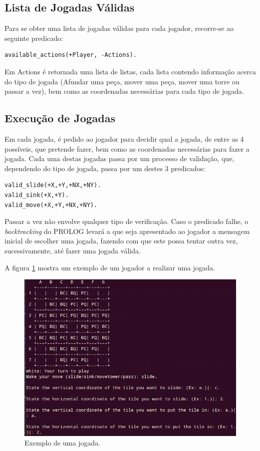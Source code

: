 \documentclass[a4paper]{article}
\begin{document}
\subsection{Lista de Jogadas Válidas}

Para se obter uma lista de jogadas válidas para cada jogador, recorre-se ao seguinte predicado:

\begin{lstlisting}
available_actions(+Player, -Actions).
\end{lstlisting}

Em Actions é retornada uma lista de listas, cada lista contendo informação acerca do tipo de jogada (Afundar uma peça, mover uma peça, mover uma torre ou passar a vez), bem como as coordenadas necessárias para cada tipo de jogada.

\subsection{Execução de Jogadas}

Em cada jogada, é pedido ao jogador para decidir qual a jogada, de entre as 4 possíveis, que pretende fazer, bem como as coordenadas necessárias para fazer a jogada. Cada uma destas jogadas passa por um processo de validação, que, dependendo do tipo de jogada, passa por um destes 3 predicados:

\begin{lstlisting}
valid_slide(+X,+Y,+NX,+NY).
valid_sink(+X,+Y).
valid_move(+X,+Y,+NX,+NY).
\end{lstlisting}

Passar a vez não envolve qualquer tipo de verificação. Caso o predicado falhe, o \textit{backtracking} do PROLOG levará a que seja apresentado ao jogador a mensagem inicial de escolher uma jogada, fazendo com que este possa tentar outra vez, sucessivamente, até fazer uma jogada válida.

A figura \ref{fig:makeplay} mostra um exemplo de um jogador a realizar uma jogada.

\begin{figure}[h]
\centering
\includegraphics[scale=0.5]{makeplay.png}
\caption{Exemplo de uma jogada.}
\label{fig:makeplay}
\end{figure}
\end{document}
